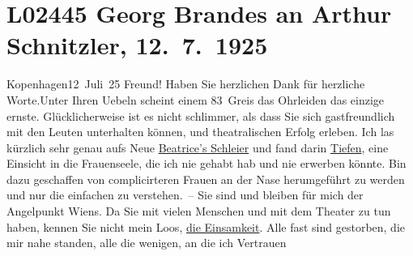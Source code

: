

\section[Georg Brandes an Arthur Schnitzler, 12. 7. 1925]{L02445 Georg Brandes an Arthur Schnitzler, 12. 7. 1925}
\nopagebreak{}
\rehead{ }\normalsize\beginnumbering{}
\toendnotes[C]{\smallbreak\pagebreak[2]}
\toendnotes[C]{\smallbreak}
\pstart
           \raggedleft{}{\pb}Kopenhagen12 Juli 25\pend
           \vspace{0.5em}
\pstart
           Freund! Haben Sie herzlichen Dank für herzliche Worte.\hspace*{2em}Unter Ihren Uebeln scheint einem 83 Greis das Ohrleiden
               das einzige ernste. Glücklicherweise ist es nicht schlimmer, als dass Sie sich
               gastfreundlich mit den Leuten unterhalten können, und theatralischen Erfolg erleben.
               Ich las kürzlich sehr genau aufs Neue \uline{Beatrice’s Schleier} und fand darin \uline{Tiefen}, eine Einsicht in die
               Frauenseele, die ich nie gehabt hab und nie erwerben könnte. Bin dazu geschaffen von
               complicirteren Frauen an der Nase herumgeführt zu werden und nur die einfachen zu
               verstehen. – Sie sind und bleiben für mich der Angelpunkt Wiens. Da Sie mit vielen Menschen und mit dem Theater zu tun
               haben, kennen Sie nicht mein Loos, \uline{die Einsamkeit}.
               Alle fast sind gestorben, die mir nahe standen, alle {\pb}die wenigen, an die ich Vertrauen
